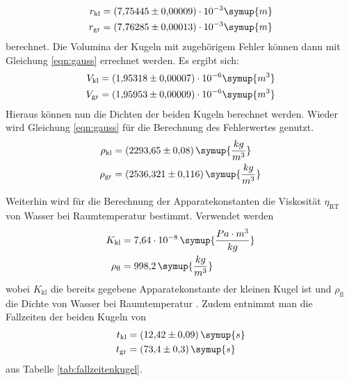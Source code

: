 \begin{equation*}
\begin{aligned}
r_{\text{kl}} &= (7{,}75445 \pm 0{,}00009) \cdot 10^{-3}\symup{m} \\
r_{\text{gr}} &= (7{,}76285 \pm 0{,}00013) \cdot 10^{-3}\symup{m}
\end{aligned}
\end{equation*}
berechnet. Die Volumina der Kugeln mit zugehörigem Fehler können dann mit Gleichung \eqref{eqn:gauss} errechnet werden. Es ergibt sich:
\begin{equation*}
\begin{aligned}
V_{\text{kl}} &= (1{,}95318 \pm 0{,}00007) \cdot 10^{-6}\symup{m^3} \\
V_{\text{gr}} &= (1{,}95953 \pm 0{,}00009) \cdot 10^{-6}\symup{m^3}
\end{aligned}
\end{equation*}
Hieraus können nun die Dichten der beiden Kugeln berechnet werden. Wieder wird Gleichung \eqref{eqn:gauss} für die Berechnung des Fehlerwertes genutzt.
\begin{equation*}
\begin{aligned}
\rho_{\text{kl}} &= (2293{,}65 \pm 0{,}08)\, \symup{\frac{kg}{m^3}} \\
\rho_{\text{gr}} &= (2536{,}321 \pm 0{,}116)\, \symup{\frac{kg}{m^3}}
\end{aligned}
\end{equation*}
 
Weiterhin wird für die Berechnung der Apparatekonstanten die Viskosität $\eta_{\text{RT}}$ von Wasser bei Raumtemperatur bestimmt. Verwendet werden
\begin{equation*}
\begin{aligned}
K_{\text{kl}} &= 7{,}64 \cdot 10^{-8}\, \symup{\frac{Pa \cdot m^3}{kg}} \\
\rho_{\text{fl}} &= 998{,}2 \, \symup{\frac{kg}{m^3}}
\end{aligned}
\end{equation*}
wobei $K_{\text{kl}}$ die bereits gegebene Apparatekonstante der kleinen Kugel ist und $\rho_{\text{fl}}$ die Dichte von Wasser bei Raumtemperatur \cite{waterdensity}.
Zudem entnimmt man die Fallzeiten der beiden Kugeln von
\begin{equation*}
\begin{aligned}
t_{\text{kl}} &= (12{,}42 \pm 0{,}09)\, \symup{s} \\
t_{\text{gr}} &= (73{,}4 \pm 0{,}3)\, \symup{s} \\
\end{aligned}
\end{equation*}
aus Tabelle \eqref{tab:fallzeitenkugel}.

